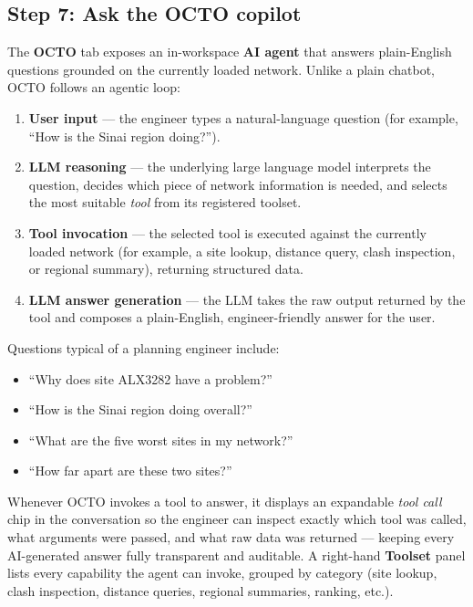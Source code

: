 \documentclass[11pt,a4paper]{article}
\begin{document}
\subsection{Step 7: Ask the OCTO copilot}
The \textbf{OCTO} tab exposes an in-workspace \textbf{AI agent} that answers plain-English questions grounded on the currently loaded network. Unlike a plain chatbot, OCTO follows an agentic loop:

\begin{enumerate}
  \item \textbf{User input} --- the engineer types a natural-language question (for example, ``How is the Sinai region doing?'').
  \item \textbf{LLM reasoning} --- the underlying large language model interprets the question, decides which piece of network information is needed, and selects the most suitable \emph{tool} from its registered toolset.
  \item \textbf{Tool invocation} --- the selected tool is executed against the currently loaded network (for example, a site lookup, distance query, clash inspection, or regional summary), returning structured data.
  \item \textbf{LLM answer generation} --- the LLM takes the raw output returned by the tool and composes a plain-English, engineer-friendly answer for the user.
\end{enumerate}

Questions typical of a planning engineer include:

\begin{itemize}
  \item ``Why does site ALX3282 have a problem?''
  \item ``How is the Sinai region doing overall?''
  \item ``What are the five worst sites in my network?''
  \item ``How far apart are these two sites?''
\end{itemize}

Whenever OCTO invokes a tool to answer, it displays an expandable \emph{tool call} chip in the conversation so the engineer can inspect exactly which tool was called, what arguments were passed, and what raw data was returned --- keeping every AI-generated answer fully transparent and auditable. A right-hand \textbf{Toolset} panel lists every capability the agent can invoke, grouped by category (site lookup, clash inspection, distance queries, regional summaries, ranking, etc.).
\end{document}
